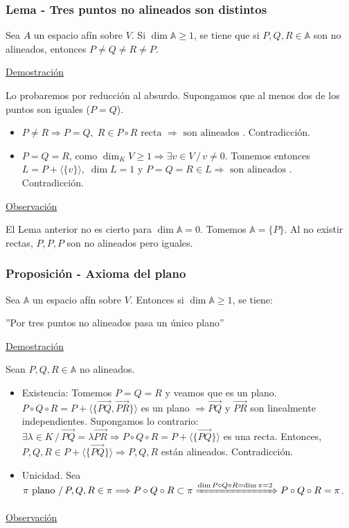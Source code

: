 \documentclass[12pt, a4paper, ones, notitlepage, openany,titlepage]{article}
\begin{document}
\subsubsection{Lema - Tres puntos no alineados son distintos}
Sea $A$ un espacio afín sobre $V$. Si $\dim \mathbb{A} \ge 1$, se tiene que si $P,Q,R \in \mathbb{A}$ son no alineados, entonces $P \neq Q \neq R \neq P$.

\noindent\underline{Demostración}

Lo probaremos por reducción al absurdo. Supongamos que al menos dos de los puntos son iguales ($P = Q$).
\begin{itemize}
	\item $P \neq R \Longrightarrow P = Q, \; R \in P \circ R \text{ recta } \Longrightarrow \text{ son alineados }$. Contradicción.
	\item $P = Q = R$, como $\dim_K V \ge 1 \Longrightarrow \exists v \in V \,/\, v \neq 0$. Tomemos entonces $L = P + \langle\{v\}\rangle, \; \dim L = 1$ y $P = Q = R \in L \Longrightarrow \text{ son alineados }$. Contradicción.
\end{itemize}

\noindent\underline{Observación}

El Lema anterior no es cierto para $\dim \mathbb{A} = 0$. Tomemos $\mathbb{A} = \{P\}$. Al no existir rectas, $P,P,P$ son no alineados pero iguales.

\subsubsection{Proposición - Axioma del plano}
\noindent Sea $\mathbb{A}$ un espacio afín sobre $V$. Entonces si $\dim \mathbb{A} \ge 1$, se tiene:
\begin{center}
	''Por tres puntos no alineados pasa un único plano''
\end{center}
\noindent\underline{Demostración}

\noindent Sean $P,Q,R \in \mathbb{A}$ no alineados.
\begin{itemize}
	\item Existencia: Tomemos $P = Q = R$ y veamos que es un plano. $P \circ Q \circ R = P + \langle\{\overrightarrow{PQ},\overrightarrow{PR}\}\rangle$ es un plano $\Longrightarrow \overrightarrow{PQ}$ y $\overrightarrow{PR}$ son linealmente independientes. Supongamos lo contrario: $\exists \lambda \in K \,/\, \overrightarrow{PQ} = \lambda \overrightarrow{PR} \Longrightarrow P \circ Q \circ R = P + \langle\{\overrightarrow{PQ}\}\rangle$ es una recta. Entonces, $P, Q, R \in P + \langle\{\overrightarrow{PQ}\}\rangle \Longrightarrow P,Q,R$ están alineados. Contradicción.
	
	\item Unicidad. Sea $\pi \text{ plano } /\, P,Q,R \in \pi \Longrightarrow P \circ Q \circ R \subset \pi \xRightarrow{ \dim P \circ Q \circ R = \dim \pi = 2 } P \circ Q \circ R = \pi$.
\end{itemize}
\noindent\underline{Observación}
\end{document}
